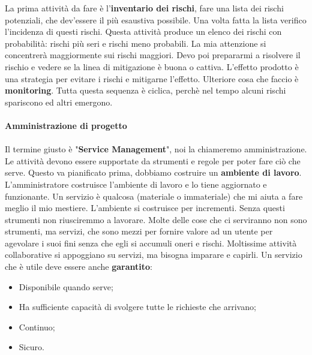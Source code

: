 La prima attività da fare è l'\textbf{inventario dei rischi}, fare una lista dei rischi potenziali, che dev'essere il più esaustiva possibile. Una volta fatta la lista verifico l'incidenza di questi rischi. Questa attività produce un elenco dei rischi con probabilità: rischi più seri e rischi meno probabili. La mia attenzione si concentrerà maggiormente sui rischi maggiori. Devo poi prepararmi a risolvere il rischio e vedere se la linea di mitigazione è buona o cattiva. L'effetto prodotto è una strategia per evitare i rischi e mitigarne l'effetto. Ulteriore cosa che faccio è \textbf{monitoring}. Tutta questa sequenza è ciclica, perchè nel tempo alcuni rischi spariscono ed altri emergono.\\\\

\textbf{Amministrazione di progetto}\\\\

Il termine giusto è "\textbf{Service Management}", noi la chiameremo amministrazione. Le attività devono essere supportate da strumenti e regole per poter fare ciò che serve. Questo va pianificato prima, dobbiamo costruire un \textbf{ambiente di lavoro}. L'amministratore costruisce l'ambiente di lavoro e lo tiene aggiornato e funzionante. Un servizio è qualcosa (materiale o immateriale) che mi aiuta a fare meglio il mio mestiere. L'ambiente si costruisce per incrementi. Senza questi strumenti non riusciremmo a lavorare. Molte delle cose che ci serviranno non sono strumenti, ma servizi, che sono mezzi per fornire valore ad un utente per agevolare i suoi fini senza che egli si accumuli oneri e rischi. Moltissime attività collaborative si appoggiano su servizi, ma bisogna imparare e capirli. Un servizio che è utile deve essere anche \textbf{garantito}:

\begin{itemize}

	\item Disponibile quando serve;
	\item Ha sufficiente capacità di svolgere tutte le richieste che arrivano;
	\item Continuo;
	\item Sicuro.

\end{itemize}

